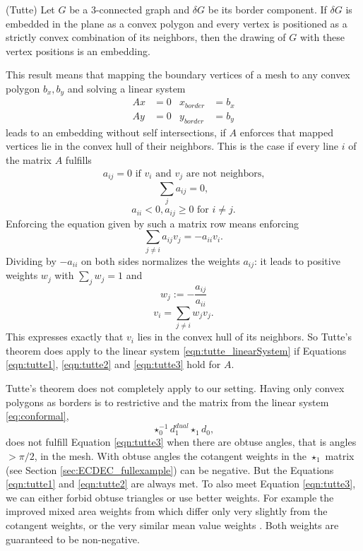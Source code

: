 \begin{thm}(Tutte)\cite{Gortler} Let $G$ be a $3$-connected graph and $\delta G$ be its border component. If $\delta G$ is embedded in the plane as a convex polygon and every vertex is positioned as a strictly convex combination of its neighbors, then the drawing of $G$ with these vertex positions is an embedding. 
\end{thm}

This result means that mapping the boundary vertices of a mesh to any convex polygon $b_x, b_y$ and solving a linear system
\begin{align}Ax &= 0 & x_{border} &= b_x \nonumber\\
Ay &= 0 &y_{border} &= b_y \label{eqn:tutte_linearSystem}\end{align}
leads to an embedding without self intersections, if $A$ enforces that mapped vertices lie in the convex hull of their neighbors. This is the case if every line $i$ of the matrix $A$ fulfills
\begin{align}
a_{ij} = 0 \text{ if $v_i$ and $v_j$ are not neighbors,} \label{eqn:tutte1}
\end{align}
\begin{equation}\sum_{j} a_{ij} = 0\label{eqn:tutte2},
\end{equation}
\begin{equation}
a_{ii} <0, a_{ij} \geq 0 \text{ for $i\neq j$}\label{eqn:tutte3}.
\end{equation}
Enforcing the equation given by such a matrix row means enforcing
$$\sum_{j\neq i} a_{ij} v_j = -a_{ii}v_i.$$
Dividing by $-a_{ii}$ on both sides normalizes the weights $a_{ij}$: it leads to positive weights $w_j$ with  $\sum_{j} w_j = 1$ and
\[w_j := -\frac{a_{ij}}{a_{ii}}\]
\[v_i = \sum_{j \neq i} w_j v_j.\]
This expresses exactly that $v_i$ lies in the convex hull of its neighbors. So Tutte's theorem does apply to the
 linear system  \ref{eqn:tutte_linearSystem} if Equations \ref{eqn:tutte1}, \ref{eqn:tutte2} and \ref{eqn:tutte3} hold for $A$.

Tutte's theorem does not completely apply to our setting. Having only convex polygons as borders is to restrictive and the matrix from the linear system \ref{eq:conformal},
\[\star_0^{-1} d_1^{dual} \star_1 d_0,\]
does not fulfill Equation \ref{eqn:tutte3} when there are obtuse angles, that is angles $> \pi/2$, in the mesh. With obtuse angles the cotangent weights in the $\star_1$ matrix (see Section \ref{sec:ECDEC_fullexample}) can be negative. But the Equations \ref{eqn:tutte1} and \ref{eqn:tutte2} are always met. 
To also meet Equation \ref{eqn:tutte3}, we can either forbid obtuse triangles or use better weights. For example the improved mixed area weights from \cite{laplacebeltrami} which differ only very slightly from the cotangent weights, or the very similar mean value weights \cite{Floater200319}. Both weights are guaranteed to be non-negative.

